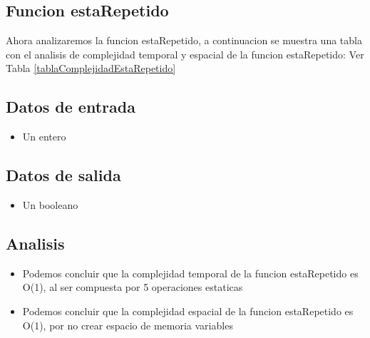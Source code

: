 \documentclass[10pt,twocolumn]{article}
\begin{document}







\subsection{Funcion estaRepetido}

Ahora analizaremos la funcion estaRepetido, a continuacion se muestra una tabla con el analisis de complejidad temporal y espacial de la funcion estaRepetido:
Ver Tabla \ref{tablaComplejidadEstaRepetido}

\subsection{Datos de entrada}
\begin{itemize}
\item Un entero
\end{itemize}

\subsection{Datos de salida}
\begin{itemize}
\item Un booleano
\end{itemize}

\subsection{Analisis}
\begin{itemize}
\item Podemos concluir que la complejidad temporal de la funcion estaRepetido es O(1), al ser compuesta por 5 operaciones estaticas
\item Podemos concluir que la complejidad espacial de la funcion estaRepetido es O(1), por no crear espacio de memoria variables
\end{itemize}
\end{document}

